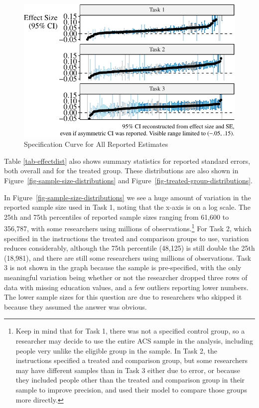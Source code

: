 \documentclass[
  letterpaper,
  DIV=11,
  numbers=noendperiod]{scrartcl}
\begin{document}
\begin{figure}

{\centering \includegraphics{The-Sources-of-Researcher-Variation-in-Economics_files/figure-pdf/fig-full-effect-distribution-1.pdf}

}

\caption{\label{fig-full-effect-distribution}Specification Curve for All
Reported Estimates}

\end{figure}

Table \ref{tab-effectdist} also shows summary statistics for reported
standard errors, both overall and for the treated group. These
distributions are also shown in
Figure~\ref{fig-sample-size-distributions} and
Figure~\ref{fig-treated-group-distributions}.

In Figure~\ref{fig-sample-size-distributions} we see a huge amount of
variation in the reported sample size used in Task 1, noting that the
x-axis is on a log scale. The 25th and 75th percentiles of reported
sample sizes ranging from 61,600 to 356,787, with some researchers using
millions of observations.\footnote{Keep in mind that for Task 1, there
  was not a specified control group, so a researcher may decide to use
  the entire ACS sample in the analysis, including people very unlike
  the eligible group in the sample. In Task 2, the instructions
  specified a treated and comparison group, but some researchers may
  have different samples than in Task 3 either due to error, or because
  they included people other than the treated and comparison group in
  their sample to improve precision, and used their model to compare
  those groups more directly.} For Task 2, which specified in the
instructions the treated and comparison groups to use, variation reduces
considerably, although the 75th percentile (48,125) is still double the
25th (18,981), and there are still some researchers using millions of
observations. Task 3 is not shown in the graph because the sample is
pre-specified, with the only meaningful variation being whether or not
the researcher dropped three rows of data with missing education values,
and a few outliers reporting lower numbers. The lower sample sizes for
this question are due to researchers who skipped it because they assumed
the answer was obvious.
\end{document}

